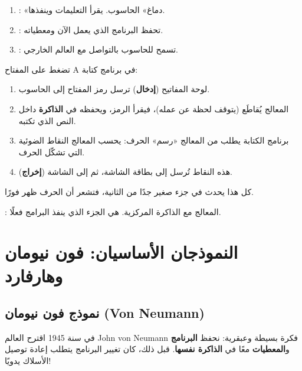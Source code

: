 \begin{enumerate}
    \item {}: «دماغ» الحاسوب. يقرأ التعليمات وينفذها.
    \item {}: تحفظ البرنامج
          الذي يعمل الآن ومعطياته.
    \item {}: تسمح
          للحاسوب بالتواصل مع العالم الخارجي.
\end{enumerate}

\begin{khatwa}
    تضغط على المفتاح \textenglish{A} في برنامج كتابة:
    \begin{enumerate}
        \item لوحة المفاتيح (\textbf{إدخال}) ترسل رمز المفتاح إلى الحاسوب.
        \item المعالج يُقاطَع (يتوقف لحظة عن عمله)، فيقرأ الرمز، ويحفظه في \textbf{الذاكرة} داخل النص الذي تكتبه.
        \item برنامج الكتابة يطلب من المعالج «رسم» الحرف: يحسب المعالج النقاط الضوئية التي تشكّل الحرف.
        \item هذه النقاط تُرسل إلى بطاقة الشاشة، ثم إلى الشاشة (\textbf{إخراج}).
    \end{enumerate}
    كل هذا يحدث في جزء صغير جدًا من الثانية، فتشعر أن الحرف ظهر فورًا.
\end{khatwa}

\begin{tarif}
    : المعالج مع الذاكرة المركزية.
    هي الجزء الذي ينفذ البرامج فعلًا.
\end{tarif}

\section{النموذجان الأساسيان: فون نيومان وهارفارد}

\subsection{نموذج فون نيومان \textenglish{(Von Neumann)}}

في سنة 1945 اقترح العالم \textenglish{John von Neumann} فكرة بسيطة وعبقرية: نحفظ
\textbf{البرنامج} و\textbf{المعطيات} معًا في \textbf{الذاكرة نفسها}. قبل ذلك، كان تغيير البرنامج
يتطلب إعادة توصيل الأسلاك يدويًا!

